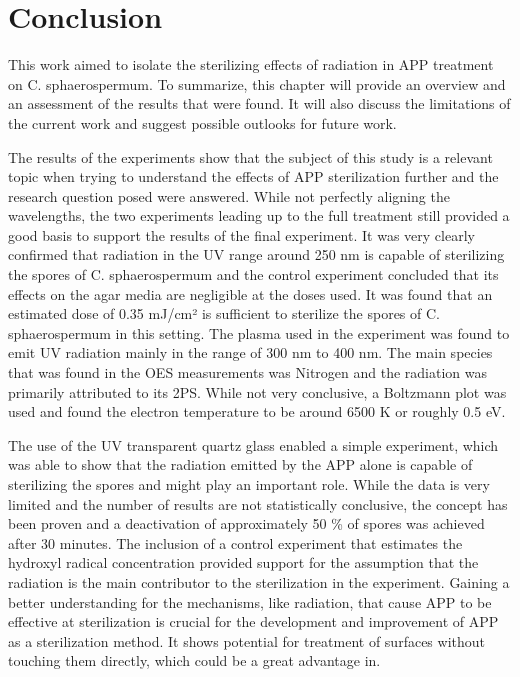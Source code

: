 \chapter{Conclusion}
\label{chap:conclusion}
This work aimed to isolate the sterilizing effects of radiation in APP treatment on C. sphaerospermum. To summarize, this chapter will provide an overview and an assessment of the results that were found. It will also discuss the limitations of the current work and suggest possible outlooks for future work.

The results of the experiments show that the subject of this study is a relevant topic when trying to understand the effects of APP sterilization further and the research question posed were answered. While not perfectly aligning the wavelengths, the two experiments leading up to the full treatment still provided a good basis to support the results of the final experiment. It was very clearly confirmed that radiation in the UV range around 250 nm is capable of sterilizing the spores of C. sphaerospermum and the control experiment concluded that its effects on the agar media are negligible at the doses used. It was found that an estimated dose of 0.35 mJ/cm² is sufficient to sterilize the spores of C. sphaerospermum in this setting. The plasma used in the experiment was found to emit UV radiation mainly in the range of 300 nm to 400 nm. The main species that was found in the OES measurements was Nitrogen and the radiation was primarily attributed to its 2PS. While not very conclusive, a Boltzmann plot was used and found the electron temperature to be around 6500 K or roughly 0.5 eV.

The use of the UV transparent quartz glass enabled a simple experiment, which was able to show that the radiation emitted by the APP alone is capable of sterilizing the spores and might play an important role. While the data is very limited and the number of results are not statistically conclusive, the concept has been proven and a deactivation of approximately 50 \% of spores was achieved after 30 minutes. The inclusion of a control experiment that estimates the hydroxyl radical concentration provided support for the assumption that the radiation is the main contributor to the sterilization in the experiment. Gaining a better understanding for the mechanisms, like radiation, that cause APP to be effective at sterilization is crucial for the development and improvement of APP as a sterilization method. It shows potential for treatment of surfaces without touching them directly, which could be a great advantage in.

